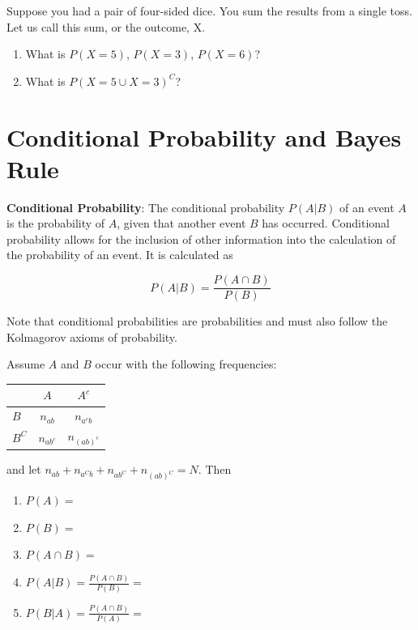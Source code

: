 \documentclass[
]{book}
\begin{document}
\begin{exercise}[Probability]
\protect\hypertarget{exr:prob1}{}\label{exr:prob1}

Suppose you had a pair of four-sided dice. You sum the results from a single toss. Let us call this sum, or the outcome, X.

\begin{enumerate}
\def\labelenumi{\arabic{enumi}.}
\item
  What is \(P(X = 5)\), \(P(X = 3)\), \(P(X = 6)\)?
\item
  What is \(P(X=5 \cup X = 3)^C\)?
\end{enumerate}

\end{exercise}

\hypertarget{conditional-probability-and-bayes-rule}{%
\section{Conditional Probability and Bayes Rule}\label{conditional-probability-and-bayes-rule}}

\textbf{Conditional Probability}: The conditional probability \(P(A|B)\) of an event \(A\) is the probability of \(A\), given that another event \(B\) has occurred. Conditional probability allows for the inclusion of other information into the calculation of the probability of an event. It is calculated as

\[P(A|B)=\frac{P(A\cap B)}{P(B)}\]

Note that conditional probabilities are probabilities and must also follow the Kolmagorov axioms of probability.

\begin{example}
\protect\hypertarget{exm:condprobexm1}{}\label{exm:condprobexm1}

Assume \(A\) and \(B\) occur with the following frequencies: \(\quad\)

\begin{longtable}[]{@{}lcc@{}}
\toprule()
& \(A\) & \(A^c\) \\
\midrule()
\endhead
\(B\) & \(n_{ab}\) & \(n_{a^cb}\) \\
\(B^C\) & \(n_{ab^c}\) & \(n_{(ab)^c}\) \\
\bottomrule()
\end{longtable}

and let \(n_{ab}+n_{a^Cb}+n_{ab^C}+n_{(ab)^C}=N\). Then

\begin{enumerate}
\def\labelenumi{\arabic{enumi}.}
\tightlist
\item
  \(P(A)=\)
\item
  \(P(B)=\)
\item
  \(P(A\cap B)=\)
\item
  \(P(A|B)= \frac{P(A\cap B)}{P(B)}=\)
\item
  \(P(B|A)= \frac{P(A\cap B)}{P(A)}=\)
\end{enumerate}

\end{example}
\end{document}
